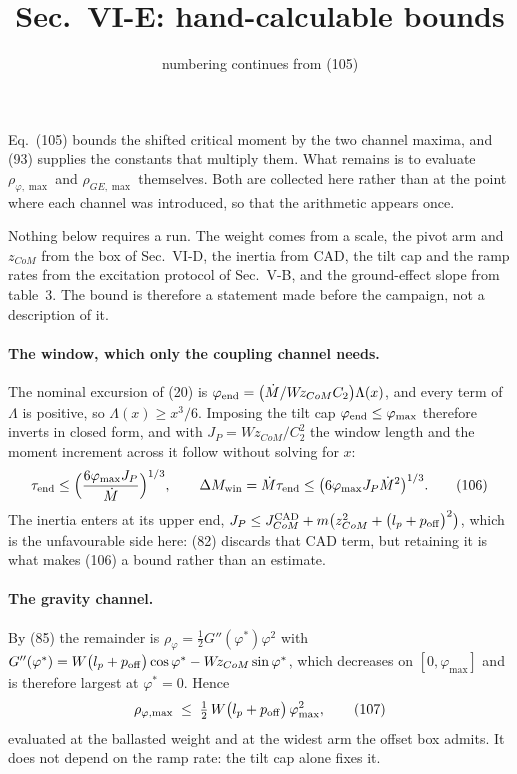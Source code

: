 \documentclass[10pt]{article}
\title{\vspace{-16mm}\textbf{Sec.~VI-E: hand-calculable bounds}\vspace{-3mm}}
\date{\small numbering continues from (105)}
\newcommand{\Wz}{W\!z_{CoM}}
\newcommand{\lpo}{\bigl(l_p + p_{\rm off}\bigr)}
\begin{document}
\maketitle

Eq.~(105) bounds the shifted critical moment by the two channel maxima,
and (93) supplies the constants that multiply them. What remains is to
evaluate $\rho_{\varphi,\max}$ and $\rho_{GE,\max}$ themselves. Both are
collected here rather than at the point where each channel was
introduced, so that the arithmetic appears once.

Nothing below requires a run. The weight comes from a scale, the pivot
arm and $z_{CoM}$ from the box of Sec.~VI-D, the inertia from CAD, the
tilt cap and the ramp rates from the excitation protocol of Sec.~V-B,
and the ground-effect slope from table~3. The bound is therefore a
statement made before the campaign, not a description of it.

\paragraph{The window, which only the coupling channel needs.}
The nominal excursion of (20) is
$\varphi_{\rm end} = \bigl(\dot M/\Wz C_2\bigr)\Lambda(x)$, and every
term of $\Lambda$ is positive, so $\Lambda(x)\ge x^3/6$. Imposing the
tilt cap $\varphi_{\rm end}\le\varphi_{\max}$ therefore inverts in
closed form, and with $J_P = \Wz/C_2^2$ the window length and the moment
increment across it follow without solving for $x$:
\begin{equation}
  \tau_{\rm end} \le
  \Bigl(\frac{6\varphi_{\max}J_P}{\dot M}\Bigr)^{1/3},
  \qquad
  \Delta M_{\rm win} = \dot M\tau_{\rm end}
  \le \bigl(6\varphi_{\max}J_P\dot M^{2}\bigr)^{1/3} .
  \tag{106}
\end{equation}
The inertia enters at its upper end, $J_P \le J_{CoM}^{\rm CAD} +
m\bigl(z_{CoM}^2 + \lpo^2\bigr)$, which is the unfavourable side here:
(82) discards that CAD term, but retaining it is what makes (106) a
bound rather than an estimate.

\paragraph{The gravity channel.}
By (85) the remainder is $\rho_\varphi = \tfrac12G''(\varphi^*)\varphi^2$
with $G''(\varphi^*) = W\lpo\cos\varphi^* - \Wz\sin\varphi^*$, which
decreases on $[0,\varphi_{\max}]$ and is therefore largest at
$\varphi^* = 0$. Hence
\begin{equation}
  \rho_{\varphi,\max} \;\le\; \tfrac12\,W\lpo\,\varphi_{\max}^{2},
  \tag{107}
\end{equation}
evaluated at the ballasted weight and at the widest arm the offset box
admits. It does not depend on the ramp rate: the tilt cap alone fixes
it.
\end{document}
